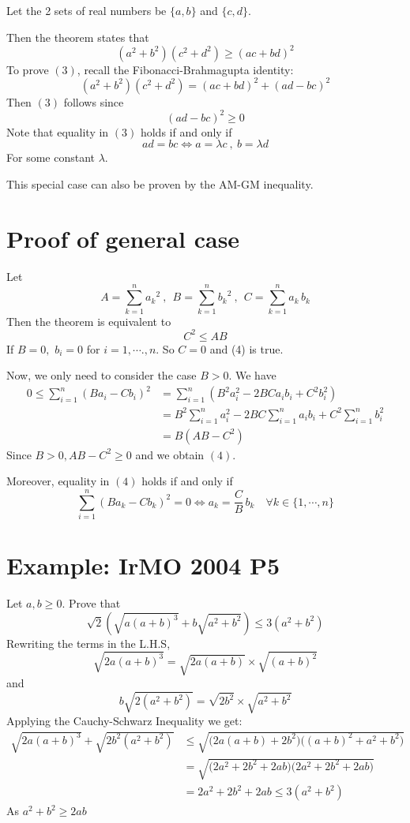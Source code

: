 \documentclass[12pt]{article}
\begin{document}
\medskip
\noindent
Let the 2 sets of real numbers be $\{a,b\}$ and $\{c,d\}$. 

\medskip
\noindent
Then the theorem states that
\begin{equation} 
\left(a^{2}+b^{2}\right)\left(c^{2}+d^{2}\right) \geq(a c+b d)^{2}
\end{equation}
To prove $(3)$, recall the Fibonacci-Brahmagupta identity:
$$\left(a^{2}+b^{2}\right)\left(c^{2}+d^{2}\right)=(a c+b d)^{2}+(a d-b c)^{2}$$
Then $(3)$ follows since
$$(a d-b c)^{2}\geq 0$$
Note that equality in $(3)$ holds if and only if 
$$ad=bc \Longleftrightarrow a=\lambda c \:,\: b=\lambda d$$
For some constant $\lambda$.

\medskip
\noindent
This special case can also be proven by the AM-GM inequality.

\newpage
\section{Proof of general case}
Let 
$$A=\sum_{k=1}^{n} {a_{k}}^{2}\:,\:\: B=\sum_{k=1}^{n} {b_{k}}^{2}\:,\:\: C=\sum_{k=1}^{n} a_{k} \,b_{k}$$
Then the theorem is equivalent to
\begin{equation}
C^2\leq A B
\end{equation}If $B=0,$ $b_{i}=0$ for $i=1,\cdots ., n$. So $C=0$ and (4) is true. 

\medskip
\noindent
Now, we only need to consider the case $ B >0 $. We have
\begin{align*}
0 \leq \sum_{i=1}^{n}\left(B a_{i}-C b_{i}\right)^{2} &=\sum_{i=1}^{n}\left(B^{2} a_{i}^{2}-2 B C a_{i} b_{i}+C^{2} b_{i}^{2}\right) \\
&=B^{2} \sum_{i=1}^{n} a_{i}^{2}-2 B C \sum_{i=1}^{n} a_{i} b_{i}+C^{2} \sum_{i=1}^{n} b_{i}^{2} \\
&=B\left(A B-C^{2}\right)
\end{align*}
Since $B>0, A B-C^{2} \geq 0 $ and we obtain $(4)$. 

\medskip 
\noindent 
Moreover, equality in $(4)$ holds if and only if
$$\sum_{i=1}^{n}\left(B a_{k}-C b_{k}\right)^{2}=0 \Longleftrightarrow {a_{k}}=\frac{C}{B}\, {b_{k}} \quad \forall k\in\{1, \cdots, n\}$$

\newpage
\section{Example: IrMO 2004 P5}
Let $a,b\ge 0$. Prove that
$$\sqrt{2}\left(\sqrt{a(a+b)^3}+b\sqrt{a^2+b^2}\right)\le 3(a^2+b^2)$$    
Rewriting the terms in the L.H.S,
$$\sqrt{2a(a+b)^3}=\sqrt{2a(a+b)}\times \sqrt{(a+b)^2}$$and$$b\sqrt{2(a^2+b^2)}=\sqrt{2b^2}\times \sqrt{a^2+b^2}$$
Applying the Cauchy-Schwarz Inequality we get:
\begin{align*}
\sqrt{2a(a+b)^3}+\sqrt{2b^2(a^2+b^2)}&\leq \sqrt{\big(2a(a+b)+2b^2\big)\big((a+b)^2+a^2+b^2\big)}\\
&= \sqrt{\big(2a^2+2b^2+2ab\big)\big(2a^2+2b^2+2ab\big)}\\
&=2a^2+2b^2+2ab\leq 3(a^2+b^2)
\end{align*}
As $a^2+b^2\geq 2ab$
\newpage
\normalsize
\end{document}
